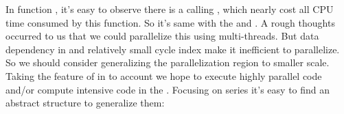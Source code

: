 \documentclass{article}
\begin{document}
\noindent{}In function , it's easy to observe there is a  calling , which nearly cost all CPU time consumed by this function. So it's same with the  and . A rough thoughts occurred to us that we could parallelize this  using multi-threads. But data dependency in  and relatively small cycle index make it inefficient to parallelize. So   we should consider generalizing the parallelization region to smaller scale. Taking the feature of  in to account we hope to execute highly parallel code and/or compute intensive code in the . Focusing on  series it's easy to find an abstract structure to generalize them:%
\end{document}
